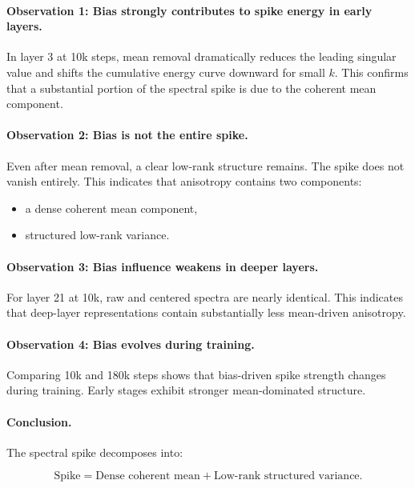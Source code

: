 \paragraph{Observation 1: Bias strongly contributes to spike energy in early layers.}

In layer 3 at 10k steps, mean removal dramatically reduces the leading singular
value and shifts the cumulative energy curve downward for small $k$.
This confirms that a substantial portion of the spectral spike is due to
the coherent mean component.

\paragraph{Observation 2: Bias is not the entire spike.}

Even after mean removal, a clear low-rank structure remains.
The spike does not vanish entirely.
This indicates that anisotropy contains two components:

\begin{itemize}
\item a dense coherent mean component,
\item structured low-rank variance.
\end{itemize}

\paragraph{Observation 3: Bias influence weakens in deeper layers.}

For layer 21 at 10k, raw and centered spectra are nearly identical.
This indicates that deep-layer representations contain substantially less
mean-driven anisotropy.

\paragraph{Observation 4: Bias evolves during training.}

Comparing 10k and 180k steps shows that bias-driven spike strength
changes during training.
Early stages exhibit stronger mean-dominated structure.

\paragraph{Conclusion.}

The spectral spike decomposes into:

\begin{equation}
\text{Spike} = \text{Dense coherent mean} + \text{Low-rank structured variance}.
\end{equation}

